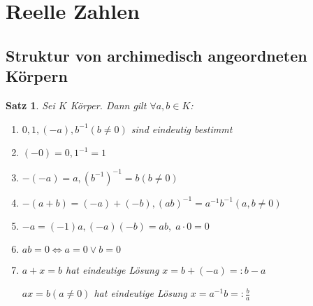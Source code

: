 \documentclass[ngerman,a4paper]{report}
\theoremstyle{break}
\newtheorem{satz}[theorem]{Satz}
\begin{document}
\section{Reelle Zahlen}
\subsection*{Struktur von archimedisch angeordneten Körpern}
\begin{satz}
	Sei $K$ Körper. Dann gilt $\forall a,b\in K$:
	\begin{enumerate}[label={\arabic*)}]
		\item $0,1,(-a),b^{-1} (b\neq 0)$ sind eindeutig bestimmt
		\item $(-0) = 0, 1^{-1} = 1$
		\item $-(-a) = a, (b^{-1})^{-1} = b (b\neq 0)$
		\item $-(a+b) = (-a) + (-b), (ab)^{-1} = a^{-1}b^{-1} (a,b\neq 0)$
		\item $-a = (-1) a, (-a)(-b) = ab,\;a\cdot 0 = 0$
		\item $ab = 0 \Leftrightarrow a=0\lor b = 0$
		\item $a+x = b$ hat eindeutige Lösung $x = b+(-a) =: b-a$ 
		
		$ax=b (a\neq 0)$ hat eindeutige Lösung $x=a^{-1}b =:\frac{b}{a}$ 
	\end{enumerate}
\end{satz}
\end{document}
